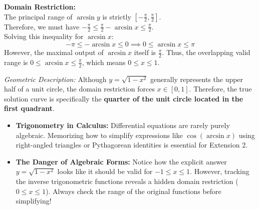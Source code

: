 \begin{solution}
\vspace{0.2cm}
\textbf{Domain Restriction:} \\
The principal range of $\arcsin y$ is strictly $\left[-\frac{\pi}{2}, \frac{\pi}{2}\right]$. \\
Therefore, we must have $-\frac{\pi}{2} \le \frac{\pi}{2} - \arcsin x \le \frac{\pi}{2}$. \\
Solving this inequality for $\arcsin x$:
\[ -\pi \le -\arcsin x \le 0 \implies 0 \le \arcsin x \le \pi \]
However, the maximal output of $\arcsin x$ itself is $\frac{\pi}{2}$. Thus, the overlapping valid range is $0 \le \arcsin x \le \frac{\pi}{2}$, which means \textbf{$0 \le x \le 1$}.

\textit{Geometric Description:} Although $y = \sqrt{1-x^2}$ generally represents the upper half of a unit circle, the domain restriction forces $x \in [0, 1]$. Therefore, the true solution curve is specifically the \textbf{quarter of the unit circle located in the first quadrant}.
\end{solution}

\begin{takeaways}
\begin{itemize}[leftmargin=*]
    \item \textbf{Trigonometry in Calculus:} Differential equations are rarely purely algebraic. Memorizing how to simplify expressions like $\cos(\arcsin x)$ using right-angled triangles or Pythagorean identities is essential for Extension 2.
    \item \textbf{The Danger of Algebraic Forms:} Notice how the explicit answer $y = \sqrt{1-x^2}$ looks like it should be valid for $-1 \le x \le 1$. However, tracking the inverse trigonometric functions reveals a hidden domain restriction ($0 \le x \le 1$). Always check the range of the original functions before simplifying!
\end{itemize}
\end{takeaways}


